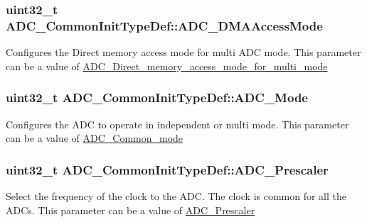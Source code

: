 \subsubsection[{A\+D\+C\+\_\+\+D\+M\+A\+Access\+Mode}]{\setlength{\rightskip}{0pt plus 5cm}uint32\+\_\+t A\+D\+C\+\_\+\+Common\+Init\+Type\+Def\+::\+A\+D\+C\+\_\+\+D\+M\+A\+Access\+Mode}\label{struct_a_d_c___common_init_type_def_a421063e29be85798195ea5f2e6c26fbd}
Configures the Direct memory access mode for multi A\+D\+C mode. This parameter can be a value of \hyperlink{group___a_d_c___direct__memory__access__mode__for__multi__mode}{A\+D\+C\+\_\+\+Direct\+\_\+memory\+\_\+access\+\_\+mode\+\_\+for\+\_\+multi\+\_\+mode} \hypertarget{struct_a_d_c___common_init_type_def_a9ac2a96e9bbbec4b680ab250051a7b54}{}
\subsubsection[{A\+D\+C\+\_\+\+Mode}]{\setlength{\rightskip}{0pt plus 5cm}uint32\+\_\+t A\+D\+C\+\_\+\+Common\+Init\+Type\+Def\+::\+A\+D\+C\+\_\+\+Mode}\label{struct_a_d_c___common_init_type_def_a9ac2a96e9bbbec4b680ab250051a7b54}
Configures the A\+D\+C to operate in independent or multi mode. This parameter can be a value of \hyperlink{group___a_d_c___common__mode}{A\+D\+C\+\_\+\+Common\+\_\+mode} \hypertarget{struct_a_d_c___common_init_type_def_a4b968331be8f4a43ef31c18f4422df4b}{}
\subsubsection[{A\+D\+C\+\_\+\+Prescaler}]{\setlength{\rightskip}{0pt plus 5cm}uint32\+\_\+t A\+D\+C\+\_\+\+Common\+Init\+Type\+Def\+::\+A\+D\+C\+\_\+\+Prescaler}\label{struct_a_d_c___common_init_type_def_a4b968331be8f4a43ef31c18f4422df4b}
Select the frequency of the clock to the A\+D\+C. The clock is common for all the A\+D\+Cs. This parameter can be a value of \hyperlink{group___a_d_c___prescaler}{A\+D\+C\+\_\+\+Prescaler} \hypertarget{struct_a_d_c___common_init_type_def_a2828abd59ed1777ae66c642d89be410e}{}
